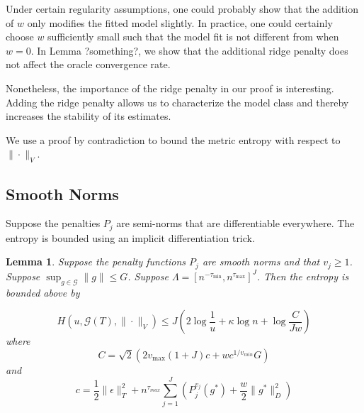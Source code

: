 \documentclass[12pt]{article}
\newtheorem{lemma}{Lemma}
\begin{document}
Under certain regularity assumptions, one could probably show that the addition of $w$ only modifies the fitted model slightly. In practice, one could certainly choose $w$ sufficiently small such that the model fit is not different from when $w = 0$.  In Lemma ?something?, we show that the additional ridge penalty does not affect the oracle convergence rate. 

Nonetheless, the importance of the ridge penalty in our proof is interesting. Adding the ridge penalty allows us to characterize the model class and thereby increases the stability of its estimates.

We use a proof by contradiction to bound the metric entropy with respect to $\| \cdot \|_V$.

\subsection{Smooth Norms}
Suppose the penalties $P_j$ are semi-norms that are differentiable everywhere. The entropy is bounded using an implicit differentiation trick.

\begin{lemma}
\label{smooth_entropy_lemma}
Suppose the penalty functions $P_j$ are smooth norms and that $v_j \ge 1$. Suppose $\sup_{g \in \mathcal{G}} \|g\| \le G$. 
Suppose $\Lambda = [n^{- \tau_{\min}} , n^{\tau_{\max}}]^J$.
Then the entropy is bounded above by

\begin{equation}
\label{smooth_entropy}
H(u, \mathcal{G}(T), \| \cdot \|_V) \le J \left ( 2 \log \frac{1}{u} + \kappa \log n + \log \frac{C}{Jw}\right )
\end{equation}
where 
\[
C = \sqrt{2}\left(2v_{\max}(1+J)c+wc^{1/v_{min}}G\right)
\] 
and
\[
c = \frac{1}{2}\|\epsilon\|_{T}^{2}+n^{\tau_{max}}\sum_{j=1}^{J}\left(P_{j}^{v_{j}}(g^{*})+\frac{w}{2}\|g^{*}\|_{D}^{2}\right)
\]

\end{lemma}
\end{document}
